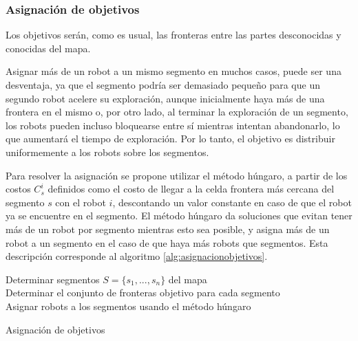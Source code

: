 \subsubsection{Asignación de objetivos}
Los objetivos serán, como es usual, las fronteras entre las partes desconocidas y conocidas del mapa.

Asignar más de un robot a un mismo segmento en muchos casos, puede ser una desventaja, ya que el segmento podría ser demasiado pequeño para que un segundo robot acelere su exploración, aunque inicialmente haya más de una frontera en el mismo o, por otro lado, al terminar la exploración de un segmento, los robots pueden incluso bloquearse entre sí mientras intentan abandonarlo, lo que aumentará el tiempo de exploración. Por lo tanto, el objetivo es distribuir uniformemente a los robots sobre los segmentos.

Para resolver la asignación se propone utilizar el método húngaro, a partir de los costos $C_{s}^{i}$ definidos como el costo de llegar a la celda frontera más cercana del segmento $s$ con el robot $i$, descontando un valor constante en caso de que el robot ya se encuentre en el segmento. El método húngaro da soluciones que evitan tener más de un robot por segmento mientras esto sea posible, y asigna más de un robot a un segmento en el caso de que haya más robots que segmentos. Esta descripción corresponde al algoritmo \ref{alg:asignacionobjetivos}.

\begin{algorithm}
\SetAlgoLined
    Determinar segmentos $S = \{s_{1} , ..., s_{n} \}$ del mapa\\
    Determinar el conjunto de fronteras objetivo para cada segmento\\
    Asignar robots a los segmentos usando el método húngaro\\
    \caption{Asignación de objetivos}
    \label{alg:asignacionobjetivos}
    
\end{algorithm}

